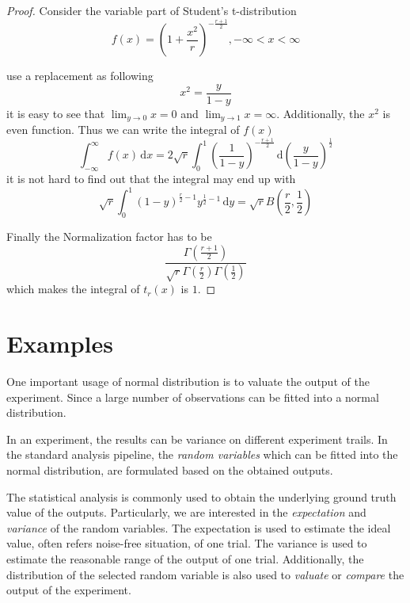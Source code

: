 \begin{proof}
    Consider the variable part of Student's t-distribution
    \begin{equation*}
        f(x) = (1+\frac{x^2}{r})^{-\frac{r+1}{2}}, -\infty < x < \infty
    \end{equation*}

    use a replacement as following
    \begin{equation*}
        x^2 = \frac{y}{1-y}
    \end{equation*}
    it is easy to see that $\lim_{y \to 0} x = 0$ and $\lim_{y \to 1} x = \infty$.
    Additionally, the $x^2$ is even function.
    Thus we can write the integral of $f(x)$
    \begin{equation*}
        \int_{-\infty}^{\infty} f(x) \,\mathrm{d}x =
        2 \sqrt{r} \int_{0}^{1} (\frac{1}{1-y})^{-\frac{r+1}{2}} \,\mathrm{d} (\frac{y}{1-y})^\frac{1}{2}
    \end{equation*}
    it is not hard to find out that the integral may end up with
    \begin{equation*}
        \sqrt{r} \int_{0}^{1} (1-y)^{\frac{r}{2}-1} y^{\frac{1}{2}-1} \,\mathrm{d}y =
        \sqrt{r} B(\frac{r}{2}, \frac{1}{2})
    \end{equation*}

    Finally the Normalization factor has to be
    \begin{equation*}
        \frac{\Gamma(\frac{r+1}{2})}{\sqrt{r} \Gamma(\frac{r}{2}) \Gamma(\frac{1}{2})}
    \end{equation*}
    which makes the integral of $t_r(x)$ is $1$.

\end{proof}


\section{Examples}

One important usage of normal distribution is to valuate the output of the experiment.
Since a large number of observations can be fitted into a normal distribution.

In an experiment, the results can be variance on different experiment trails.
In the standard analysis pipeline,
the \emph{random variables} which can be fitted into the normal distribution,
are formulated based on the obtained outputs.

The statistical analysis is commonly used to obtain the underlying ground truth value of the outputs.
Particularly, we are interested in the \emph{expectation} and \emph{variance} of the random variables.
The expectation is used to estimate the ideal value, often refers noise-free situation, of one trial.
The variance is used to estimate the reasonable range of the output of one trial.
Additionally, the distribution of the selected random variable is also used to \emph{valuate} or \emph{compare} the output of the experiment.

